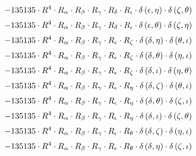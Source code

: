 \begin{subequations}
\begin{gather}
 \\[0.2em] \notag 		 - 135135 \cdot R^{4} \cdot R_{\alpha{}} \cdot R_{\beta{}} \cdot R_{\gamma{}} \cdot R_{\delta{}} \cdot R_{\iota{}} \cdot \delta{}\left(\epsilon{}, \eta{}\right) \cdot \delta{}\left(\zeta{}, \theta{}\right) 
 \\[0.2em] \notag 		 - 135135 \cdot R^{4} \cdot R_{\alpha{}} \cdot R_{\beta{}} \cdot R_{\gamma{}} \cdot R_{\delta{}} \cdot R_{\iota{}} \cdot \delta{}\left(\epsilon{}, \theta{}\right) \cdot \delta{}\left(\zeta{}, \eta{}\right) 
 \\[0.2em] \notag 		 - 135135 \cdot R^{4} \cdot R_{\alpha{}} \cdot R_{\beta{}} \cdot R_{\gamma{}} \cdot R_{\epsilon{}} \cdot R_{\zeta{}} \cdot \delta{}\left(\delta{}, \eta{}\right) \cdot \delta{}\left(\theta{}, \iota{}\right) 
 \\[0.2em] \notag 		 - 135135 \cdot R^{4} \cdot R_{\alpha{}} \cdot R_{\beta{}} \cdot R_{\gamma{}} \cdot R_{\epsilon{}} \cdot R_{\zeta{}} \cdot \delta{}\left(\delta{}, \theta{}\right) \cdot \delta{}\left(\eta{}, \iota{}\right) 
 \\[0.2em] \notag 		 - 135135 \cdot R^{4} \cdot R_{\alpha{}} \cdot R_{\beta{}} \cdot R_{\gamma{}} \cdot R_{\epsilon{}} \cdot R_{\zeta{}} \cdot \delta{}\left(\delta{}, \iota{}\right) \cdot \delta{}\left(\eta{}, \theta{}\right) 
 \\[0.2em] \notag 		 - 135135 \cdot R^{4} \cdot R_{\alpha{}} \cdot R_{\beta{}} \cdot R_{\gamma{}} \cdot R_{\epsilon{}} \cdot R_{\eta{}} \cdot \delta{}\left(\delta{}, \zeta{}\right) \cdot \delta{}\left(\theta{}, \iota{}\right) 
 \\[0.2em] \notag 		 - 135135 \cdot R^{4} \cdot R_{\alpha{}} \cdot R_{\beta{}} \cdot R_{\gamma{}} \cdot R_{\epsilon{}} \cdot R_{\eta{}} \cdot \delta{}\left(\delta{}, \theta{}\right) \cdot \delta{}\left(\zeta{}, \iota{}\right) 
 \\[0.2em] \notag 		 - 135135 \cdot R^{4} \cdot R_{\alpha{}} \cdot R_{\beta{}} \cdot R_{\gamma{}} \cdot R_{\epsilon{}} \cdot R_{\eta{}} \cdot \delta{}\left(\delta{}, \iota{}\right) \cdot \delta{}\left(\zeta{}, \theta{}\right) 
 \\[0.2em] \notag 		 - 135135 \cdot R^{4} \cdot R_{\alpha{}} \cdot R_{\beta{}} \cdot R_{\gamma{}} \cdot R_{\epsilon{}} \cdot R_{\theta{}} \cdot \delta{}\left(\delta{}, \zeta{}\right) \cdot \delta{}\left(\eta{}, \iota{}\right) 
 \\[0.2em] \notag 		 - 135135 \cdot R^{4} \cdot R_{\alpha{}} \cdot R_{\beta{}} \cdot R_{\gamma{}} \cdot R_{\epsilon{}} \cdot R_{\theta{}} \cdot \delta{}\left(\delta{}, \eta{}\right) \cdot \delta{}\left(\zeta{}, \iota{}\right) 

\end{gather}
\end{subequations}
